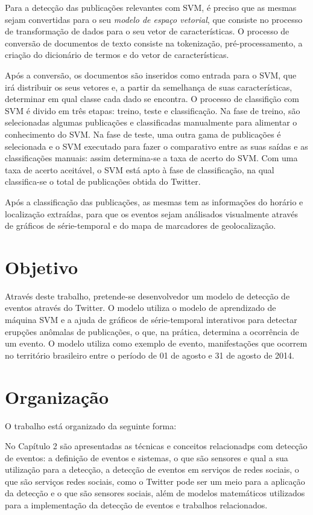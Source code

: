 Para a detecção das publicações relevantes com SVM, é preciso que as mesmas sejam convertidas para o seu \textit{modelo de espaço vetorial}, que consiste no processo de transformação de dados para o seu vetor de características. O processo de conversão de documentos de texto consiste na tokenização, pré-processamento, a criação do dicionário de termos e do vetor de características.

Após a conversão, os documentos são inseridos como entrada para o SVM, que irá distribuir os seus vetores e, a partir da semelhança de suas características, determinar em qual classe cada dado se encontra. O processo de classifição com SVM é divido em três etapas: treino, teste e classificação. Na fase de treino, são selecionadas algumas publicações e classificadas manualmente para alimentar o conhecimento do SVM. Na fase de teste, uma outra gama de publicações é selecionada e o SVM executado para fazer o comparativo entre as suas saídas e as classificações manuais: assim determina-se a taxa de acerto do SVM. Com uma taxa de acerto aceitável, o SVM está apto à fase de classificação, na qual classifica-se o total de publicações obtida do Twitter.

Após a classificação das publicações, as mesmas tem as informações do horário e localização extraídas, para que os eventos sejam análisados visualmente através de gráficos de série-temporal e do mapa de marcadores de geolocalização.

\section{Objetivo}

Através deste trabalho, pretende-se desenvolvedor um modelo de detecção de eventos através do Twitter. O modelo utiliza o modelo de aprendizado de máquina SVM e a ajuda de gráficos de série-temporal interativos para detectar erupções anômalas de publicações, o que, na prática, determina a ocorrência de um evento. O modelo utiliza como exemplo de evento, manifestações que ocorrem no território brasileiro entre o período de 01 de agosto e 31 de agosto de 2014.

\section{Organização}

O trabalho está organizado da seguinte forma:

No Capítulo 2 são apresentadas as técnicas e conceitos relacionadps com detecção de eventos: a definição de eventos e sistemas, o que são sensores e qual a sua utilização para a detecção, a detecção de eventos em serviços de redes sociais, o que são serviços redes sociais, como o Twitter pode ser um meio para a aplicação da detecção e o que são sensores sociais, além de modelos matemáticos utilizados para a implementação da detecção de eventos e trabalhos relacionados.

